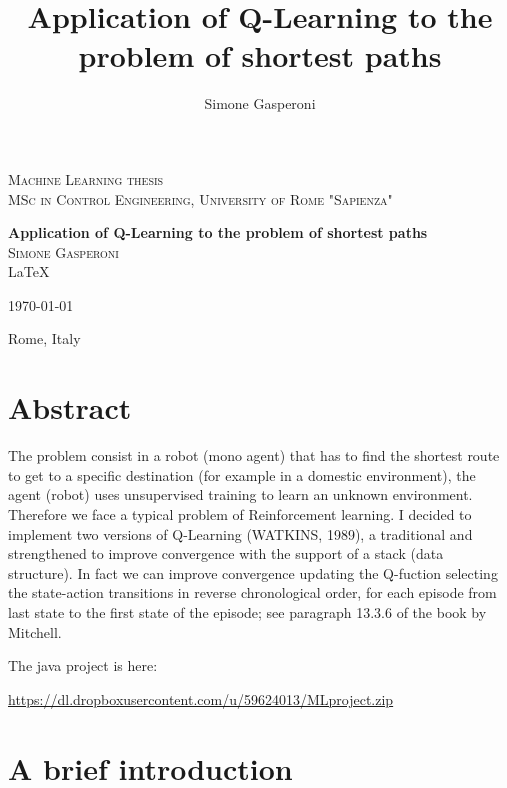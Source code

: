 \documentclass[a4paper]{article}
\author{Simone Gasperoni}
\title{Application of Q-Learning to the problem of shortest paths}
\begin{document}
\begin{titlepage}
\begin{center}

\textsc{Machine Learning thesis}\\[0.5cm]
\textsc{MSc in Control Engineering, University of Rome "Sapienza"}\\[0.5cm]

\hrulefill

{ \huge \bfseries Application of Q-Learning to the problem of shortest paths \\[0.4cm] }
\textsc{\Large Simone Gasperoni}\\[0.5cm]
\vfill
\LaTeX

\today

Rome, Italy
\end{center}
\end{titlepage}


\maketitle
\tableofcontents
\newpage

\section{Abstract}
The problem consist in a robot (mono agent) that has to find the shortest route to get to a specific destination (for example in a domestic environment), the agent (robot) uses unsupervised training to learn an unknown environment.
Therefore we face a typical problem of Reinforcement learning.
I decided to implement two versions of Q-Learning (WATKINS, 1989), a traditional and strengthened to improve convergence with the support of a stack (data structure). In fact we can improve convergence  updating the Q-fuction selecting the state-action transitions in reverse chronological order, for each episode from last state to the first state of the episode; see paragraph 13.3.6 of the book by Mitchell.

The java project is here:

\url{https://dl.dropboxusercontent.com/u/59624013/MLproject.zip}
\section{A brief introduction}
\end{document}
